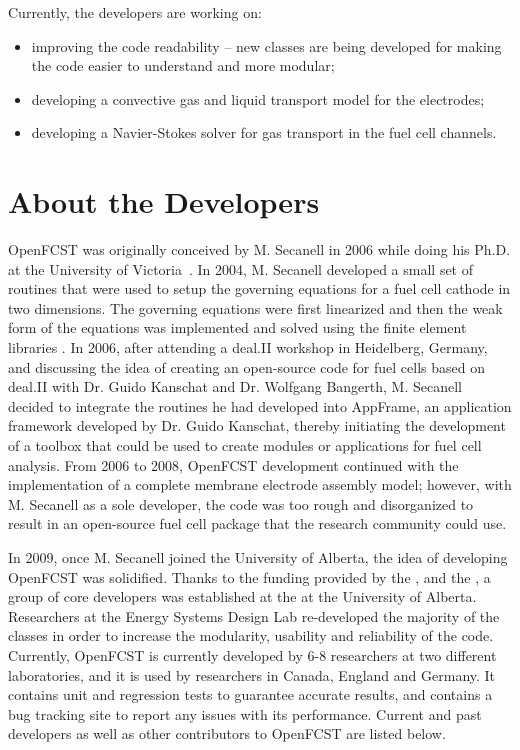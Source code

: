 Currently, the developers are working on:
\begin{itemize}
 \item improving the code readability – new classes are being developed for making the code easier to understand and more modular;
 \item developing a convective gas and liquid transport model for the electrodes;
 \item developing a Navier-Stokes solver for gas transport in the fuel cell channels.
\end{itemize}

\section{About the Developers}

OpenFCST was originally conceived by M. Secanell in 2006 while doing his Ph.D. at the University of Victoria~\cite{Secanell07}. In 2004, M. Secanell developed a small set of routines that were used to setup the governing equations for a fuel cell cathode in two dimensions. The governing equations were first linearized and then the weak form of the equations was implemented and solved using the  finite element libraries \cite{Secanell07b}. In 2006, after attending a deal.II workshop in Heidelberg, Germany, and discussing the idea of creating an open-source code for fuel cells based on deal.II with Dr. Guido Kanschat and Dr. Wolfgang Bangerth, M. Secanell decided to integrate the routines he had developed into AppFrame, an application framework developed by Dr. Guido Kanschat, thereby initiating the development of a toolbox that could be used to create modules or applications for fuel cell analysis. From 2006 to 2008, OpenFCST development continued with the implementation of a complete membrane electrode assembly model; however, with M. Secanell as a sole developer, the code was too rough and disorganized to result in an open-source fuel cell package that the research community could use. 

In 2009, once M. Secanell joined the University of Alberta, the idea of developing OpenFCST was solidified. Thanks to the funding provided by the ,  and the , a group of core developers was established at the  at the University of Alberta. Researchers at the Energy Systems Design Lab re-developed the majority of the classes in order to increase the modularity, usability and reliability of the code. Currently, OpenFCST is currently developed by 6-8 researchers at two different laboratories, and it is used by researchers in Canada, England and Germany. It contains unit and regression tests to guarantee accurate results, and contains a bug tracking site to report any issues with its performance. Current and past developers as well as other contributors to OpenFCST are listed below. \\

